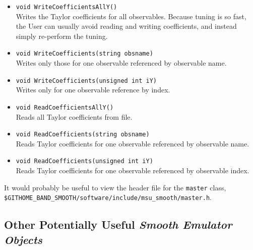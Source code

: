 \documentclass[UserManual.tex]{subfiles}
\begin{document}
\begin{itemize}
\item {\tt void WriteCoefficientsAllY()}\\
Writes the Taylor coefficients for all observables. Because tuning is so fast, the User can usually avoid reading and writing coefficients, and instead simply re-perform the tuning. 
\item {\tt void WriteCoefficients(string obsname)}\\
Writes only those for one observable referenced by observable name.
\item {\tt void WriteCoefficients(unsigned int iY)}\\
Writes only for one observable reference by index.
\item {\tt void ReadCoefficientsAllY()}\\
Reads all Taylor coefficients from file.
\item {\tt void ReadCoefficients(string obsname)}\\
Reads Taylor coefficients for one observable referenced by observable name.
\item {\tt void ReadCoefficients(unsigned int iY)}\\
Reads Taylor coefficients for one observable referenced by observable index.
\end{itemize}
It would probably be useful to view the header file for the {\tt master} class, {\tt \${GITHOME\_BAND\_SMOOTH}/software/include/msu\_smooth/master.h}.

\subsection{Other Potentially Useful {\it Smooth Emulator Objects}}
\end{document}
